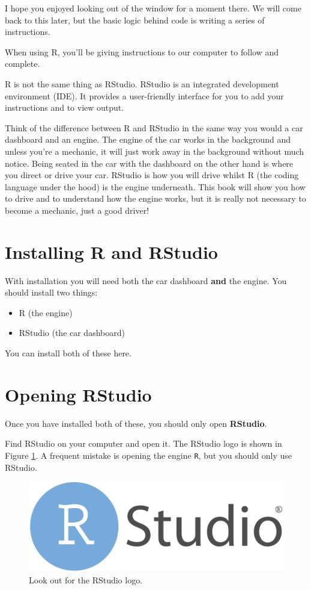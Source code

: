 \documentclass[
]{book}
\providecommand{\tightlist}{%
  \setlength{\itemsep}{0pt}\setlength{\parskip}{0pt}}
\let\oldsection\section
\renewcommand{\section}{\needspace{5\baselineskip}\oldsection}
\begin{document}
I hope you enjoyed looking out of the window for a moment there. We will come back to this later, but the basic logic behind code is writing a series of instructions.

When using R, you'll be giving instructions to our computer to follow and complete.

R is not the same thing as RStudio. RStudio is an integrated development environment (IDE). It provides a user-friendly interface for you to add your instructions and to view output.

Think of the difference between R and RStudio in the same way you would a car dashboard and an engine. The engine of the car works in the background and unless you're a mechanic, it will just work away in the background without much notice. Being seated in the car with the dashboard on the other hand is where you direct or drive your car. RStudio is how you will drive whilst R (the coding language under the hood) is the engine underneath. This book will show you how to drive and to understand how the engine works, but it is really not necessary to become a mechanic, just a good driver!

\section{Installing R and RStudio}\label{installing-r-and-rstudio}

With installation you will need both the car dashboard \textbf{and} the engine. You should install two things:

\begin{itemize}
\tightlist
\item
  R (the engine)
\item
  RStudio (the car dashboard)
\end{itemize}

You can install both of these here.

\section{Opening RStudio}\label{opening-rstudio}

Once you have installed both of these, you should only open \textbf{RStudio}.

Find RStudio on your computer and open it. The RStudio logo is shown in Figure \ref{fig:fig2}. A frequent mistake is opening the engine \texttt{R}, but you should only use RStudio.

\begin{figure}

{\centering \includegraphics[width=0.25\linewidth]{images/RStudio} 

}

\caption{Look out for the RStudio logo.}\label{fig:fig2}
\end{figure}
\end{document}
